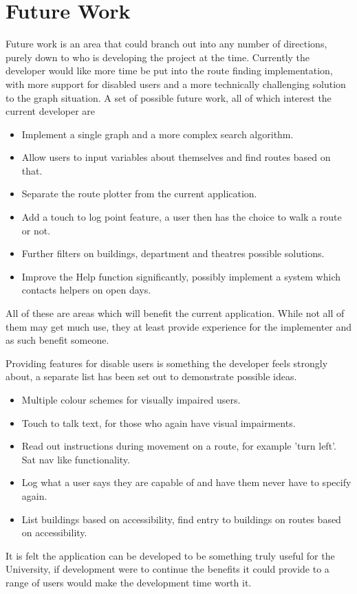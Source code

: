 \section{Future Work}
Future work is an area that could branch out into any number of directions, purely down to who is developing the project at the time. Currently the developer would like more time be put into the route finding implementation, with more support for disabled users and a more technically challenging solution to the graph situation. A set of possible future work, all of which interest the current developer are 
\begin{itemize}
   \item Implement a single graph and a more complex search algorithm.
   \item Allow users to input variables about themselves and find routes based on that.
   \item Separate the route plotter from the current application.
   \item Add a touch to log point feature, a user then has the choice to walk a route or not. 
   \item Further filters on buildings, department and theatres possible solutions. 
   \item Improve the Help function significantly, possibly implement a system which contacts helpers on open days. 
\end{itemize}

All of these are areas which will benefit the current application. While not all of them may get much use, they at least provide experience for the implementer and as such benefit someone. 

Providing features for disable users is something the developer feels strongly about, a separate list has been set out to demonstrate possible ideas. 

\begin{itemize}
   \item Multiple colour schemes for visually impaired users.
   \item Touch to talk text, for those who again have visual impairments.
   \item Read out instructions during movement on a route, for example 'turn left'. Sat nav like functionality.
   \item Log what a user says they are capable of and have them never have to specify again.  
   \item List buildings based on accessibility, find entry to buildings on routes based on accessibility. 
\end{itemize}

It is felt the application can be developed to be something truly useful for the University, if development were to continue the benefits it could provide to a range of users would make the development time worth it. 
